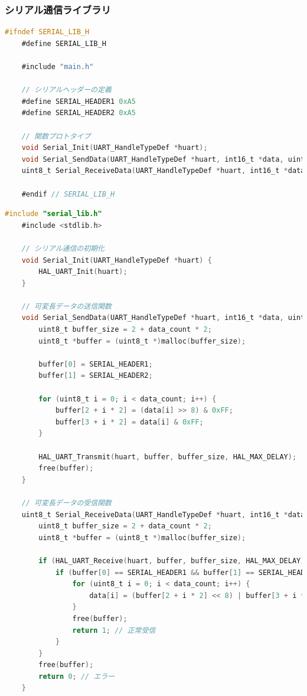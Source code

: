 \subsubsection{シリアル通信ライブラリ}

\begin{lstlisting}[language=C, caption=シリアル通信ライブラリ(serial\_lib.h)]
    #ifndef SERIAL_LIB_H
    #define SERIAL_LIB_H
    
    #include "main.h"
    
    // シリアルヘッダーの定義
    #define SERIAL_HEADER1 0xA5
    #define SERIAL_HEADER2 0xA5
    
    // 関数プロトタイプ
    void Serial_Init(UART_HandleTypeDef *huart);
    void Serial_SendData(UART_HandleTypeDef *huart, int16_t *data, uint8_t data_count);
    uint8_t Serial_ReceiveData(UART_HandleTypeDef *huart, int16_t *data, uint8_t data_count);
    
    #endif // SERIAL_LIB_H
\end{lstlisting}

\begin{lstlisting}[language=C, caption=シリアル通信ライブラリ(serial\_lib.c)]
    #include "serial_lib.h"
    #include <stdlib.h>
    
    // シリアル通信の初期化
    void Serial_Init(UART_HandleTypeDef *huart) {
        HAL_UART_Init(huart);
    }
    
    // 可変長データの送信関数
    void Serial_SendData(UART_HandleTypeDef *huart, int16_t *data, uint8_t data_count) {
        uint8_t buffer_size = 2 + data_count * 2;
        uint8_t *buffer = (uint8_t *)malloc(buffer_size);
    
        buffer[0] = SERIAL_HEADER1;
        buffer[1] = SERIAL_HEADER2;
    
        for (uint8_t i = 0; i < data_count; i++) {
            buffer[2 + i * 2] = (data[i] >> 8) & 0xFF;
            buffer[3 + i * 2] = data[i] & 0xFF;
        }
    
        HAL_UART_Transmit(huart, buffer, buffer_size, HAL_MAX_DELAY);
        free(buffer);
    }
    
    // 可変長データの受信関数
    uint8_t Serial_ReceiveData(UART_HandleTypeDef *huart, int16_t *data, uint8_t data_count) {
        uint8_t buffer_size = 2 + data_count * 2;
        uint8_t *buffer = (uint8_t *)malloc(buffer_size);
    
        if (HAL_UART_Receive(huart, buffer, buffer_size, HAL_MAX_DELAY) == HAL_OK) {
            if (buffer[0] == SERIAL_HEADER1 && buffer[1] == SERIAL_HEADER2) {
                for (uint8_t i = 0; i < data_count; i++) {
                    data[i] = (buffer[2 + i * 2] << 8) | buffer[3 + i * 2];
                }
                free(buffer);
                return 1; // 正常受信
            }
        }
        free(buffer);
        return 0; // エラー
    }
\end{lstlisting}

